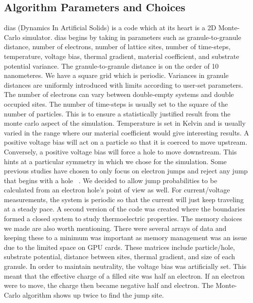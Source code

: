 \subsection{Algorithm Parameters and Choices}
{\sc dias} (Dynamics In Artificial Solids) is a code which at its heart is a 2D Monte-Carlo simulator. {\sc dias} begins by taking in parameters such as granule-to-granule distance, number of electrons, number of lattice sites, number of time-steps, temperature, voltage bias, thermal gradient, material coefficient, and substrate potential variance. The granule-to-granule distance is on the order of 10 nanometeres. We have a square grid which is periodic. Variances in granule distances are uniformly introduced with limits according to user-set parameters. The number of electrons can vary between double-empty systems and double occupied sites. The number of time-steps is usually set to the square of the number of particles. This is to ensure a statistically justified result from the monte carlo aspect of the simulation. Temperature is set in Kelvin and is usually varied in the range where our material coefficient would give interesting results.  A positive voltage bias will act on a particle so that it is coerced to move upstream. Conversely, a positive voltage bias will force a hole to move downstream. This hints at a particular symmetry in which we chose for the simulation. Some previous studies have chosen to only focus on electron jumps and reject any jump that begins with a hole ~\cite{Ferrero14}. We decided to allow jump probabilities to be calculated from an electron hole's point of view as well. For current/voltage measurements, the system is periodic so that the current will just keep traveling at a steady pace. A second version of the code was created where the boundaries formed a closed system to study thermoelectric properties. The memory choices we made are also worth mentioning. There were several arrays of data and keeping these to a minimum was important as memory management was an issue due to the limited space on GPU cards. These matrices include particle/hole, substrate potential, distance between sites, thermal gradient, and size of each granule. In order to maintain neutrality, the voltage bias was artificially set. This meant that the effective charge of a filled site was half an electron. If an electron were to move, the charge then became negative half and electron. The Monte-Carlo algorithm shows up twice to find the jump site.  

